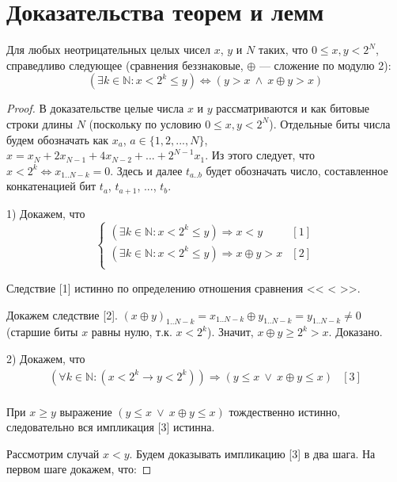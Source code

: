 \chapter{Доказательства теорем и лемм}\label{sec:proofs}

\begin{lemma}\label{QuantorElimination}
Для любых неотрицательных целых чисел $x$, $y$ и $N$ таких, что $0 \leqslant x, y < 2^N$, справедливо следующее (сравнения беззнаковые, $\oplus$ --- сложение по модулю 2):
$$( \exists k \in \mathds{N} : x < 2^k \leqslant y ) \Leftrightarrow (y > x ~\wedge~ x \oplus y > x)$$
\end{lemma}
\begin{proof}
В доказательстве целые числа $x$ и $y$ рассматриваются и как битовые строки длины $N$ (поскольку по условию $0 \leqslant x, y < 2^N$). Отдельные биты числа будем обозначать как $x_a$, $a \in \{1, 2, ..., N\}$, $x = x_N + 2x_{N-1} + 4x_{N-2} + ... + 2^{N-1} x_1$. Из этого следует, что $x < 2^k \Leftrightarrow x_{1 .. N-k} = 0$. Здесь и далее $t_{a..b}$ будет обозначать число, составленное конкатенацией бит $t_a$, $t_{a+1}$, ..., $t_b$.

1) Докажем, что
$$\left\{\begin{array}{lc}
( \exists k \in \mathds{N} : x < 2^k \leqslant y ) \Rightarrow x < y & [1]\\
( \exists k \in \mathds{N} : x < 2^k \leqslant y ) \Rightarrow  x \oplus y > x & [2]\\
\end{array}\right.$$

Следствие [1] истинно по определению отношения сравнения << < >>.

Докажем следствие [2]. $(x \oplus y)_{1..N-k} = x_{1..N-k} \oplus y_{1..N-k} = y_{1..N-k} \neq 0$ (старшие биты $x$ равны нулю, т.к. $x < 2^k$). Значит, $x \oplus y \geqslant 2^k > x$. Доказано.

2) Докажем, что
$$\begin{array}{lc}
( \forall k \in \mathds{N} : (x < 2^k \rightarrow y < 2^k )) \Rightarrow (y \leqslant x ~\vee~ x \oplus y \leqslant x) & [3]\\
\end{array}$$

При $x \geqslant y$ выражение $(y \leqslant x ~\vee~ x \oplus y \leqslant x)$ тождественно истинно, следовательно вся импликация [3] истинна.

Рассмотрим случай $x < y$. Будем доказывать импликацию [3] в два шага. На первом шаге докажем, что:


\end{proof}

